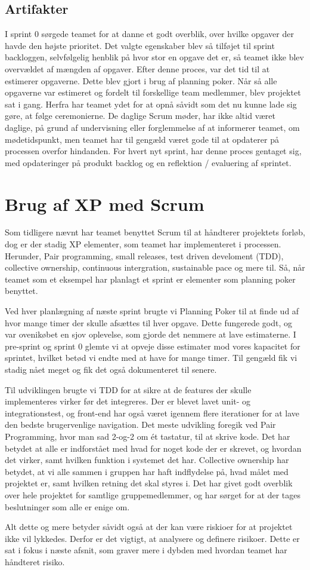 \subsection{Artifakter}

I sprint 0 sørgede teamet for at danne et godt overblik, over hvilke opgaver der havde den højste prioritet. Det valgte egenskaber blev så tilføjet til sprint backloggen, selvfølgelig henblik på hvor stor en opgave det er, så teamet ikke blev overvældet af mængden af opgaver. Efter denne proces, var det tid til at estimerer opgaverne. Dette blev gjort i brug af planning poker. Når så alle opgaverne var estimeret og fordelt til forskellige team medlemmer, blev projektet sat i gang. Herfra har teamet ydet for at opnå såvidt som det nu kunne lade sig gøre, at følge ceremonierne. De daglige Scrum møder, har ikke altid været daglige, på grund af undervisning eller forglemmelse af at informerer teamet, om mødetidspunkt, men teamet har til gengæld været gode til at opdaterer på processen overfor hindanden. For hvert nyt sprint, har denne proces gentaget sig, med opdateringer på produkt backlog og en reflektion / evaluering af sprintet. 



\section{Brug af XP med Scrum}

Som tidligere nævnt har teamet benyttet Scrum til at håndterer projektets forløb, dog er der stadig XP elementer, som teamet har implementeret i processen. Herunder, Pair programming, small releases, test driven develoment (TDD), collective ownership, continuous intergration, sustainable pace og mere til. Så, når teamet som et eksempel har planlagt et sprint er elementer som planning poker benyttet. 

Ved hver planlægning af næste sprint brugte vi Planning Poker til at finde ud af hvor mange timer der skulle afsættes til hver opgave. Dette fungerede godt, og var ovenikøbet en sjov oplevelse, som gjorde det nemmere at lave estimaterne. I pre-sprint og sprint 0 glemte vi at opveje disse estimater mod vores kapacitet for sprintet, hvilket betød vi endte med at have for mange timer. Til gengæld fik vi stadig nået meget og fik det også dokumenteret til senere. 

Til udviklingen brugte vi TDD for at sikre at de features der skulle implementeres virker før det integreres. Der er blevet lavet unit- og integrationstest, og front-end har også været igennem flere iterationer for at lave den bedste brugervenlige navigation. 
Det meste udvikling foregik ved Pair Programming, hvor man sad 2-og-2 om ét tastatur, til at skrive kode. Det har betydet at alle er indforstået med hvad for noget kode der er skrevet, og hvordan det virker, samt hvilken funktion i systemet det har. 
Collective ownership har betydet, at vi alle sammen i gruppen har haft indflydelse på, hvad målet med projektet er, samt hvilken retning det skal styres i. Det har givet godt overblik over hele projektet for samtlige gruppemedlemmer, og har sørget for at der tages beslutninger som alle er enige om.

Alt dette og mere betyder såvidt også at der kan være riskioer for at projektet ikke vil lykkedes. Derfor er det vigtigt, at analysere og definere risikoer. Dette er sat i fokus i næste afsnit, som graver mere i dybden med hvordan teamet har håndteret risiko.
